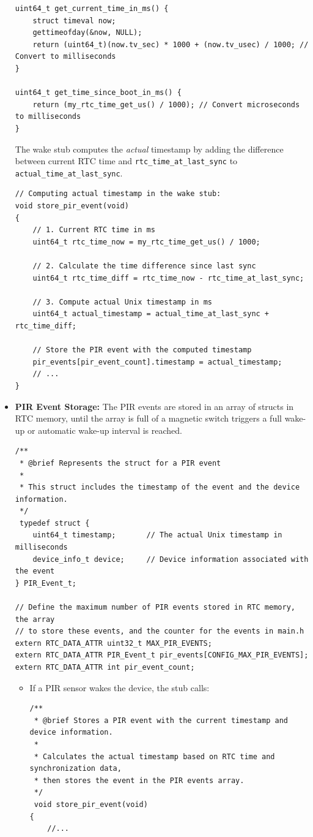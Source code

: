 \documentclass[A4,10pt]{article}
\begin{document}
\begin{itemize}
\begin{verbatim}
uint64_t get_current_time_in_ms() {
    struct timeval now;
    gettimeofday(&now, NULL);
    return (uint64_t)(now.tv_sec) * 1000 + (now.tv_usec) / 1000; // Convert to milliseconds
}

uint64_t get_time_since_boot_in_ms() {
    return (my_rtc_time_get_us() / 1000); // Convert microseconds to milliseconds
}

\end{verbatim}
      The wake stub computes the \emph{actual} timestamp by adding the difference between current RTC time and \texttt{rtc\_time\_at\_last\_sync} to \texttt{actual\_time\_at\_last\_sync}.
\begin{verbatim}
// Computing actual timestamp in the wake stub:
void store_pir_event(void)
{
    // 1. Current RTC time in ms
    uint64_t rtc_time_now = my_rtc_time_get_us() / 1000;

    // 2. Calculate the time difference since last sync
    uint64_t rtc_time_diff = rtc_time_now - rtc_time_at_last_sync;

    // 3. Compute actual Unix timestamp in ms
    uint64_t actual_timestamp = actual_time_at_last_sync + rtc_time_diff;

    // Store the PIR event with the computed timestamp
    pir_events[pir_event_count].timestamp = actual_timestamp;
    // ...
}
\end{verbatim}
    \item \textbf{PIR Event Storage:}
	The PIR events are stored in an array of structs in RTC memory, until the array is full of a magnetic switch triggers a full wake-up or automatic wake-up interval is reached.
	\begin{verbatim}
/**
 * @brief Represents the struct for a PIR event
 *
 * This struct includes the timestamp of the event and the device information.
 */
 typedef struct {
    uint64_t timestamp;       // The actual Unix timestamp in milliseconds
    device_info_t device;     // Device information associated with the event
} PIR_Event_t;

// Define the maximum number of PIR events stored in RTC memory, the array 
// to store these events, and the counter for the events in main.h
extern RTC_DATA_ATTR uint32_t MAX_PIR_EVENTS;
extern RTC_DATA_ATTR PIR_Event_t pir_events[CONFIG_MAX_PIR_EVENTS];
extern RTC_DATA_ATTR int pir_event_count;
	\end{verbatim}
    \begin{itemize}
        \item If a PIR sensor wakes the device, the stub calls:
\begin{verbatim}
/**
 * @brief Stores a PIR event with the current timestamp and device information.
 *
 * Calculates the actual timestamp based on RTC time and synchronization data,
 * then stores the event in the PIR events array.
 */
 void store_pir_event(void)
{
	//...


\end{verbatim}
\end{itemize}
\end{itemize}
\end{document}
